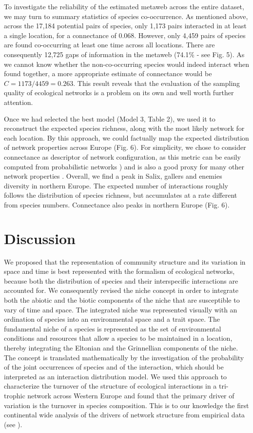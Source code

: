 \documentclass[12pt]{article}
\begin{document}
To investigate the reliability of the estimated metaweb across the entire
dataset, we may turn to summary statistics of species co-occurrence. As
mentioned above, across the 17,184 potential pairs of species, only 1,173 pairs
interacted in at least a single location, for a connectance of 0.068. However,
only 4,459 pairs of species are found co-occurring at least one time across all
locations. There are consequently 12,725 gaps of information in the metaweb
(74.1\% - see Fig. 5). As we cannot know whether the non-co-occurring species
would indeed interact when found together, a more appropriate estimate of
connectance would be $C=1173/4459=0.263$. This result reveals that the
evaluation of the sampling quality of ecological networks is a problem on its
own and well worth further attention.

Once we had selected the best model (Model 3, Table 2), we used it to
reconstruct the expected species richness, along with the most likely network
for each location. By this approach, we could factually map the expected
distribution of network properties across Europe (Fig. 6). For simplicity, we
chose to consider connectance as descriptor of network configuration, as this
metric can be easily computed from probabilistic networks \citep{Poisot2015c}) and is
also a good proxy for many other network properties \citep{Poisot2014}. Overall, we
find a peak in Salix, gallers and enemies diversity in northern Europe. The
expected number of interactions roughly follows the distribution of species
richness, but accumulates at a rate different from species numbers.
Connectance also peaks in northern Europe (Fig. 6).

\section*{Discussion}

We proposed that the representation of community structure and its variation
in space and time is best represented with the formalism of ecological
networks, because both the distribution of species and their interspecific
interactions are accounted for. We consequently revised the niche concept in
order to integrate both the abiotic and the biotic components of the niche
that are susceptible to vary of time and space. The integrated niche was
represented visually with an ordination of species into an environmental space
and a trait space. The fundamental niche of a species is represented as the
set of environmental conditions and resources that allow a species to be
maintained in a location, thereby integrating the Eltonian and the Grinnellian
components of the niche. The concept is translated mathematically by the
investigation of the probability of the joint occurrences of species and of
the interaction, which should be interpreted as an interaction distribution
model. We used this approach to characterize the turnover of the structure of
ecological interactions in a tri-trophic network across Western Europe and
found that the primary driver of variation is the turnover in species
composition. This is to our knowledge the first continental wide analysis of
the drivers of network structure from empirical data (see \citealt{Albouy2014,
Poisot2016}).
\end{document}
